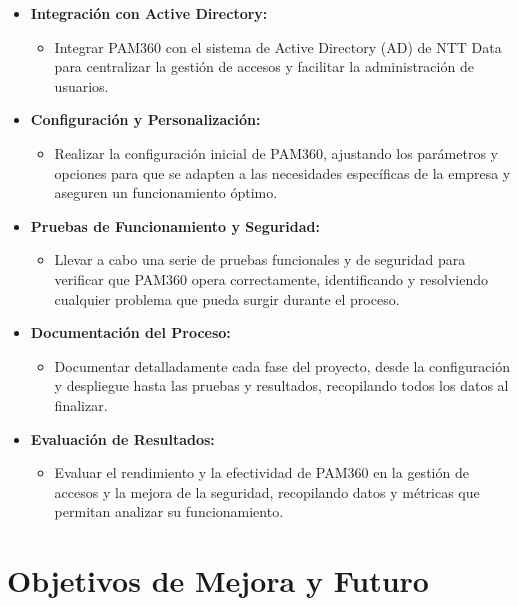 \begin{itemize}
	\item \textbf{Integración con Active Directory:}
	\begin{itemize}
		\item Integrar PAM360 con el sistema de Active Directory (AD) de NTT Data para centralizar la gestión de accesos y facilitar la administración de usuarios.
	\end{itemize}
	
	\item \textbf{Configuración y Personalización:}
	\begin{itemize}
		\item Realizar la configuración inicial de PAM360, ajustando los parámetros y opciones para que se adapten a las necesidades específicas de la empresa y aseguren un funcionamiento óptimo.
	\end{itemize}
	
	\item \textbf{Pruebas de Funcionamiento y Seguridad:}
	\begin{itemize}
		\item Llevar a cabo una serie de pruebas funcionales y de seguridad para verificar que PAM360 opera correctamente, identificando y resolviendo cualquier problema que pueda surgir durante el proceso.
	\end{itemize}
	
	\item \textbf{Documentación del Proceso:}
	\begin{itemize}
		\item Documentar detalladamente cada fase del proyecto, desde la configuración y despliegue hasta las pruebas y resultados, recopilando todos los datos al finalizar.
	\end{itemize}
	
	\item \textbf{Evaluación de Resultados:}
	\begin{itemize}
		\item Evaluar el rendimiento y la efectividad de PAM360 en la gestión de accesos y la mejora de la seguridad, recopilando datos y métricas que permitan analizar su funcionamiento.
	\end{itemize}
\end{itemize}

\section{Objetivos de Mejora y Futuro}

